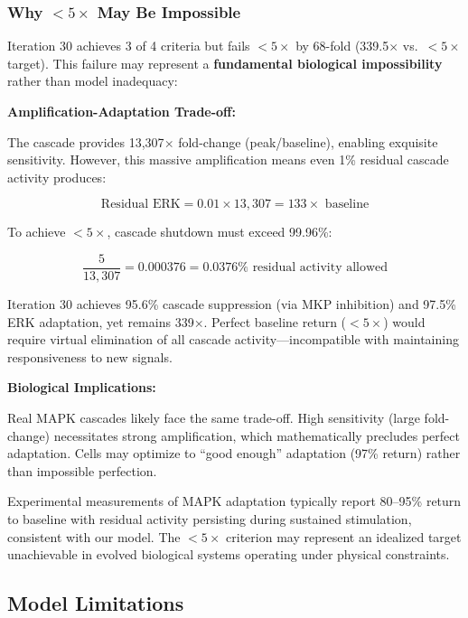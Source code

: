 \documentclass[twocolumn,11pt]{article}
\newcommand{\erk}{ERK}
\newcommand{\mkp}{MKP}
\newcommand{\mapk}{MAPK}
\newcommand{\srr}{\text{SRR}}
\begin{document}
\subsubsection{Why \srr{} $<5\times$ May Be Impossible}

Iteration 30 achieves 3 of 4 criteria but fails \srr{} $<5\times$ by 68-fold (339.5$\times$ vs.\ $<5\times$ target). This failure may represent a \textbf{fundamental biological impossibility} rather than model inadequacy:

\textbf{Amplification-Adaptation Trade-off:}

The cascade provides 13,307$\times$ fold-change (peak/baseline), enabling exquisite sensitivity. However, this massive amplification means even 1\% residual cascade activity produces:

\begin{equation}
\text{Residual ERK} = 0.01 \times 13{,}307 = 133\times \text{ baseline}
\end{equation}

To achieve \srr{} $< 5\times$, cascade shutdown must exceed 99.96\%:

\begin{equation}
\frac{5}{13{,}307} = 0.000376 = 0.0376\% \text{ residual activity allowed}
\end{equation}

Iteration 30 achieves 95.6\% cascade suppression (via \mkp{} inhibition) and 97.5\% \erk{} adaptation, yet \srr{} remains 339$\times$. Perfect baseline return ($<5\times$) would require virtual elimination of all cascade activity---incompatible with maintaining responsiveness to new signals.

\textbf{Biological Implications:}

Real \mapk{} cascades likely face the same trade-off. High sensitivity (large fold-change) necessitates strong amplification, which mathematically precludes perfect adaptation. Cells may optimize to ``good enough'' adaptation (97\% return) rather than impossible perfection.

Experimental measurements of \mapk{} adaptation typically report 80--95\% return to baseline with residual activity persisting during sustained stimulation, consistent with our model. The $<5\times$ criterion may represent an idealized target unachievable in evolved biological systems operating under physical constraints.

\subsection{Model Limitations}
\end{document}
